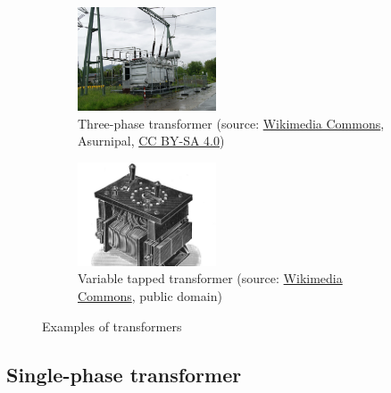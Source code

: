 \begin{frame}
\begin{figure}
		\begin{subfigure}[b]{0.49\textwidth}
			\centering
			\includegraphics[width=0.45\textwidth]{fig/lec04/Three_phase_transformer.jpg}
			\caption{Three-phase transformer (source: \href{https://commons.wikimedia.org/wiki/File:Dornbirn-Umspannwerk_Werben-110kV_FS6-Anlage_Trafo_Elin_220-110kV-01ASD.jpg}{Wikimedia Commons}, Asurnipal, \href{https://creativecommons.org/licenses/by-sa/4.0/deed.en}{CC BY-SA 4.0})}
		\end{subfigure}
		\hfill
		\begin{subfigure}[b]{0.49\textwidth}
			\centering
			\includegraphics[width=0.45\textwidth]{fig/lec04/Tapped_transformer.jpg}
			\caption{Variable tapped transformer (source: \href{https://commons.wikimedia.org/wiki/File:Variable-tap_regulating_transformer_(Rankin_Kennedy,_Electrical_Installations,_Vol_II,_1909).jpg}{Wikimedia Commons}, public domain)}
		\end{subfigure}
		\caption*{Examples of transformers} 
        \label{fig:examples_transformers}
	\end{figure}
\end{frame}

\subsection{Single-phase transformer}


